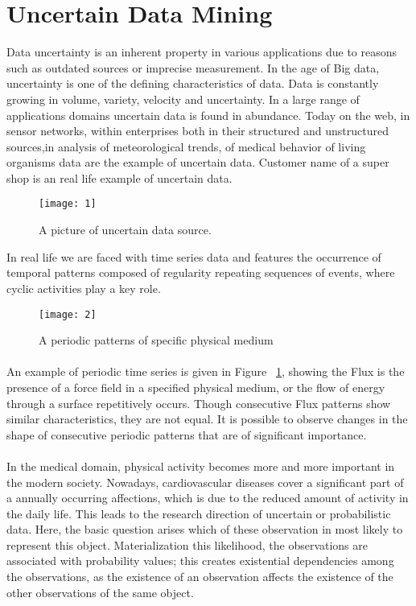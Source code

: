 \documentclass[a4paper,12pt]{book}
\begin{document}
\section{Uncertain Data Mining}
Data uncertainty is an inherent property in various applications due to reasons such as outdated sources or imprecise measurement. In the age of Big data, uncertainty is one of the defining characteristics of data. Data is constantly growing in volume, variety, velocity and uncertainty. In a large range of applications domains uncertain data is found in abundance.  Today on the web, in sensor networks, within enterprises both in their structured and unstructured sources,in analysis of meteorological trends, of medical behavior of living organisms data are the example of uncertain data. Customer name of a super shop is an real life example of uncertain data.

\begin{figure}[h!]
  \centering
    \texttt{[image: 1]}
    \caption{A picture of uncertain data source.}
\end{figure}
In real life we are faced with time series data and features the occurrence of temporal patterns composed of regularity repeating sequences of events, where cyclic activities play a key role.
\begin{figure}[h!]
\texttt{[image: 2]}
\caption{A periodic patterns of specific physical medium}
\label{fig:Periodic time series}
\end{figure}
\paragraph{}
An example of periodic time series is given in Figure ~\ref{fig:Periodic time series}, showing the Flux is the presence of a force field in a specified physical medium, or the flow of energy through a surface repetitively occurs. Though consecutive Flux patterns show similar characteristics, they are not equal. It is possible to observe changes in the shape of consecutive periodic patterns that are of significant importance.
\paragraph{}
In the medical domain, physical activity becomes more and more important in the modern society. Nowadays, cardiovascular diseases cover a significant part of a annually occurring affections, which is due to the reduced amount of activity in the daily life. This leads to the research direction of uncertain or probabilistic data. Here, the basic question arises which of these observation in most likely to represent this object. Materialization this likelihood, the observations are associated with probability values; this creates existential dependencies among the observations, as the existence of an observation affects the existence of the other observations of the same object.
\end{document}
